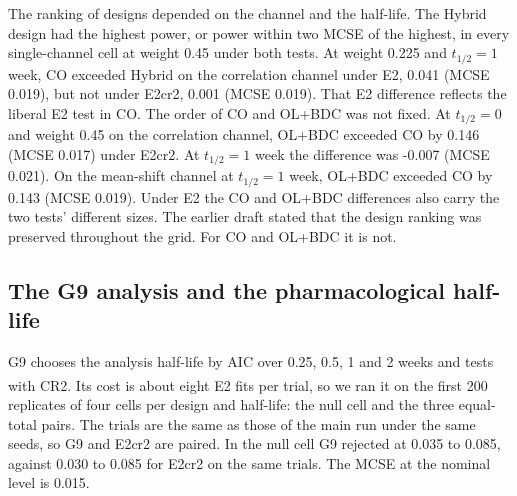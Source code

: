 \documentclass[
  11pt,
]{article}
\begin{document}
The ranking of designs depended on the channel and the half-life. The
Hybrid design had the highest power, or power within two MCSE of the
highest, in every single-channel cell at weight 0.45 under both
tests. At weight 0.225 and \(t_{1/2} = 1\) week, CO exceeded Hybrid on
the correlation channel under E2,
0.041 (MCSE 0.019), but not under E2cr2,
0.001 (MCSE 0.019). That E2 difference
reflects the liberal E2 test in CO. The order of CO and OL+BDC was not fixed. At
\(t_{1/2} = 0\) and weight 0.45 on the correlation channel, OL+BDC
exceeded CO by 0.146 (MCSE 0.017) under E2cr2.
At \(t_{1/2} = 1\) week the difference was
-0.007 (MCSE 0.021). On the mean-shift channel
at \(t_{1/2} = 1\) week, OL+BDC exceeded CO by
0.143 (MCSE 0.019). Under E2 the CO and OL+BDC
differences also carry the two tests' different sizes. The earlier
draft stated that the design ranking was preserved throughout the
grid. For CO and OL+BDC it is not.

\subsection{The G9 analysis and the pharmacological half-life}\label{sec-g9}

G9 chooses the analysis half-life by AIC over 0.25, 0.5, 1 and 2 weeks and tests with CR2\textsuperscript{}. Its cost is about eight E2 fits per trial, so we ran it on the first 200 replicates of four cells per design and half-life: the null cell and the three equal-total pairs. The trials are the same as those of the main run under the same seeds, so G9 and E2cr2 are paired. In the null cell G9 rejected at 0.035 to 0.085, against 0.030 to 0.085 for E2cr2 on the same trials. The MCSE at the nominal level is 0.015.
\end{document}
